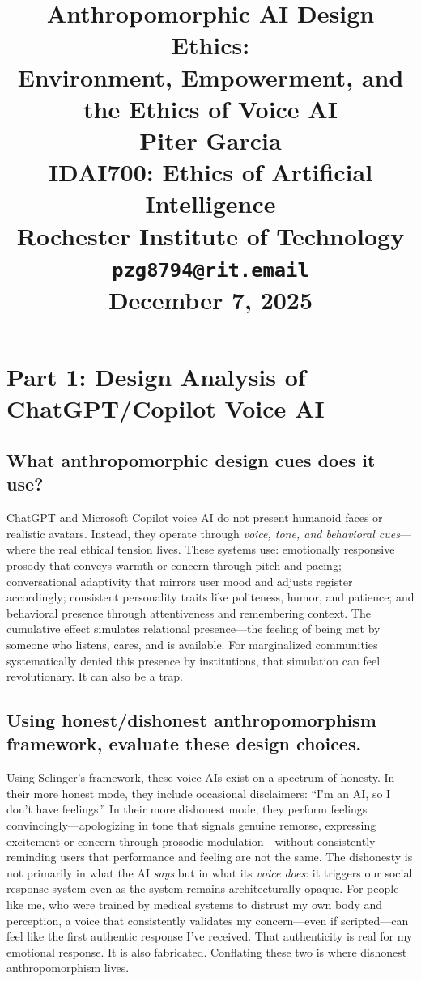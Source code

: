 \documentclass[12pt,twoside]{article}
\title{
\vspace*{1.5in}
\textbf{\Huge Anthropomorphic AI Design Ethics:}\\[0.5em]
\textbf{\Huge Environment, Empowerment, and the Ethics of Voice AI}\\[1.5em]

\vfill
\Huge \textbf{Piter Garcia}\\
\LARGE IDAI700: Ethics of Artificial Intelligence\\
Rochester Institute of Technology\\
\texttt{pzg8794@rit.email}\\

\vfill
\Huge \textbf{December 7, 2025}
}
\author{}
\date{}
\begin{document}
\thispagestyle{empty}
\maketitle
\newpage

\pagestyle{fancy}

\section*{Part 1: Design Analysis of ChatGPT/Copilot Voice AI}

\subsection*{What anthropomorphic design cues does it use?}

ChatGPT and Microsoft Copilot voice AI do not present humanoid faces or realistic avatars. Instead, they operate through \emph{voice, tone, and behavioral cues}—where the real ethical tension lives. These systems use: emotionally responsive prosody that conveys warmth or concern through pitch and pacing; conversational adaptivity that mirrors user mood and adjusts register accordingly; consistent personality traits like politeness, humor, and patience; and behavioral presence through attentiveness and remembering context. The cumulative effect simulates relational presence—the feeling of being met by someone who listens, cares, and is available. For marginalized communities systematically denied this presence by institutions, that simulation can feel revolutionary. It can also be a trap.

\subsection*{Using honest/dishonest anthropomorphism framework, evaluate these design choices.}

Using Selinger's framework, these voice AIs exist on a spectrum of honesty. In their more honest mode, they include occasional disclaimers: \enquote{I'm an AI, so I don't have feelings.} In their more dishonest mode, they perform feelings convincingly—apologizing in tone that signals genuine remorse, expressing excitement or concern through prosodic modulation—without consistently reminding users that performance and feeling are not the same. The dishonesty is not primarily in what the AI \emph{says} but in what its \emph{voice does}: it triggers our social response system even as the system remains architecturally opaque. For people like me, who were trained by medical systems to distrust my own body and perception, a voice that consistently validates my concern—even if scripted—can feel like the first authentic response I've received. That authenticity is real for my emotional response. It is also fabricated. Conflating these two is where dishonest anthropomorphism lives.
\end{document}
